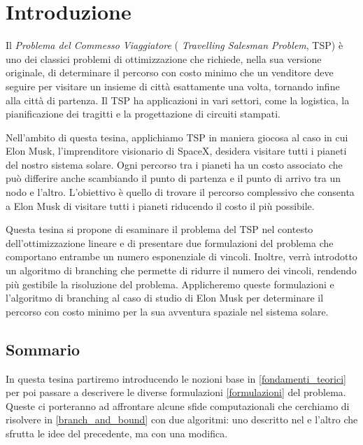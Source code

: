 \chapter{Introduzione}

Il \textit{Problema del Commesso Viaggiatore} ( \textit{Travelling Salesman Problem}, TSP) è uno dei classici problemi di ottimizzazione che richiede, nella sua versione originale, di determinare il percorso con costo minimo che un venditore deve seguire per visitare un insieme di città esattamente una volta, tornando infine alla città di partenza. Il TSP ha applicazioni in vari settori, come la logistica, la pianificazione dei tragitti e la progettazione di circuiti stampati.

Nell'ambito di questa tesina, applichiamo TSP in maniera giocosa al caso in cui Elon Musk, l'imprenditore visionario di SpaceX, desidera visitare tutti i pianeti del nostro sistema solare. Ogni percorso tra i pianeti ha un costo associato che può differire anche scambiando il punto di partenza e il punto di arrivo tra un nodo e l'altro. L’obiettivo è quello di trovare il percorso complessivo che consenta a Elon Musk di visitare tutti i pianeti riducendo il costo il più possibile.

Questa tesina si propone di esaminare il problema del TSP nel contesto dell'ottimizzazione lineare e di presentare due formulazioni del problema che comportano entrambe un numero esponenziale di vincoli. Inoltre, verrà introdotto un algoritmo di branching che permette di ridurre il numero dei vincoli, rendendo più gestibile la risoluzione del problema. Applicheremo queste formulazioni e l'algoritmo di branching al caso di studio di Elon Musk per determinare il percorso con costo minimo per la sua avventura spaziale nel sistema solare.


\section{Sommario}

In questa tesina partiremo introducendo le nozioni base in \ref{fondamenti_teorici} per poi passare a descrivere le diverse formulazioni \ref{formulazioni} del problema. Queste ci porteranno ad affrontare alcune sfide computazionali che cerchiamo di risolvere in \ref{branch_and_bound} con due algoritmi: uno descritto nel \cite{bertsimas} e l'altro che sfrutta le idee del precedente, ma con una modifica.
